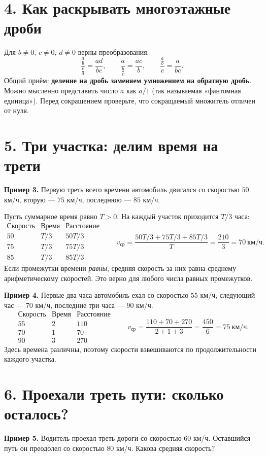 \documentclass[a4paper,12pt]{article}
\newcommand{\key}[1]{\textcolor{darkaccent}{\textbf{#1}}}
\begin{document}
\section*{4. Как раскрывать многоэтажные дроби}
Для $b\ne0$, $c\ne0$, $d\ne0$ верны преобразования:
\[
\frac{\frac ab}{\frac cd}=\frac{ad}{bc},\qquad
\frac{a}{\frac bc}=\frac{ac}{b},\qquad
\frac{\frac ab}{c}=\frac{a}{bc}.
\]
Общий приём: \key{деление на дробь заменяем умножением на обратную дробь}. Можно мысленно представить число $a$ как $a/1$ (так называемая «фантомная единица»). Перед сокращением проверьте, что сокращаемый множитель отличен от нуля.

\section*{5. Три участка: делим время на трети}
\textbf{Пример 3.} Первую треть всего времени автомобиль двигался со скоростью $50$ км/ч, вторую --- $75$ км/ч, последнюю --- $85$ км/ч.

Пусть суммарное время равно $T>0$. На каждый участок приходится $T/3$ часа:
\[
\begin{array}{c|c|c}
\text{Скорость}&\text{Время}&\text{Расстояние}\\ \hline
50&T/3&50T/3\\
75&T/3&75T/3\\
85&T/3&85T/3
\end{array}
\qquad
v_{\text{ср}}=\frac{50T/3+75T/3+85T/3}{T}
=\frac{210}{3}=\boxed{70\ \text{км/ч}}.
\]
Если промежутки времени \emph{равны}, средняя скорость за них равна среднему арифметическому скоростей. Это верно для любого числа равных промежутков.

\textbf{Пример 4.} Первые два часа автомобиль ехал со скоростью $55$ км/ч, следующий час --- $70$ км/ч, последние три часа --- $90$ км/ч.
\[
\begin{array}{c|c|c}
\text{Скорость}&\text{Время}&\text{Расстояние}\\ \hline
55&2&110\\70&1&70\\90&3&270
\end{array}
\qquad
v_{\text{ср}}=\frac{110+70+270}{2+1+3}
=\frac{450}{6}=\boxed{75\ \text{км/ч}}.
\]
Здесь времена различны, поэтому скорости взвешиваются по продолжительности каждого участка.

\section*{6. Проехали треть пути: сколько осталось?}
\textbf{Пример 5.} Водитель проехал треть дороги со скоростью $60$ км/ч. Оставшийся путь он преодолел со скоростью $80$ км/ч. Какова средняя скорость?
\end{document}
